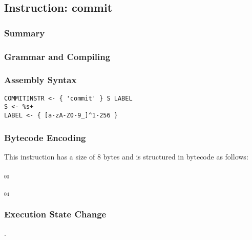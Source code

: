 \subsection{Instruction: commit}

\subsubsection{Summary}


\subsubsection{Grammar and Compiling}


\subsubsection{Assembly Syntax}

\begin{myquote}
\begin{verbatim}
COMMITINSTR <- { 'commit' } S LABEL
S <- %s+
LABEL <- { [a-zA-Z0-9_]^1-256 }
\end{verbatim}
\end{myquote}

\subsubsection{Bytecode Encoding}

This instruction has a size of 8 bytes and is structured in bytecode as follows:

$_{00}$\ 



$_{04}$\ 


\subsubsection{Execution State Change}

.


